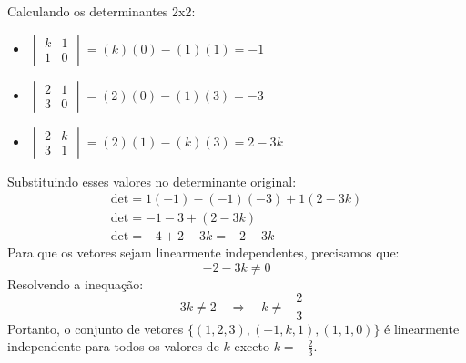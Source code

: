 \begin{resolution}
  Calculando os determinantes 2x2:

  \begin{itemize}
    \item \( \begin{vmatrix}
            k & 1 \\
            1 & 0
          \end{vmatrix} = (k)(0) - (1)(1) = -1 \)

    \item \( \begin{vmatrix}
            2 & 1 \\
            3 & 0
          \end{vmatrix} = (2)(0) - (1)(3) = -3 \)

    \item \( \begin{vmatrix}
            2 & k \\
            3 & 1
          \end{vmatrix} = (2)(1) - (k)(3) = 2 - 3k \)
  \end{itemize}
  Substituindo esses valores no determinante original:
  \begin{gather}
    \text{det} = 1(-1) - (-1)(-3) + 1(2 - 3k) \\
    \text{det} = -1 - 3 + (2 - 3k) \\
    \text{det} = -4 + 2 - 3k = -2 - 3k
  \end{gather}
  Para que os vetores sejam linearmente independentes, precisamos que:
  \begin{equation}
    -2 - 3k \neq 0
  \end{equation}
  Resolvendo a inequação:
  \begin{equation}
    -3k \neq 2 \quad \Rightarrow \quad k \neq -\frac{2}{3}
  \end{equation}
  Portanto, o conjunto de vetores \( \{(1, 2, 3), (-1, k, 1), (1, 1, 0)\} \) é linearmente independente para todos os valores de \( k \) exceto \( k = -\frac{2}{3} \). \\
\end{resolution}

